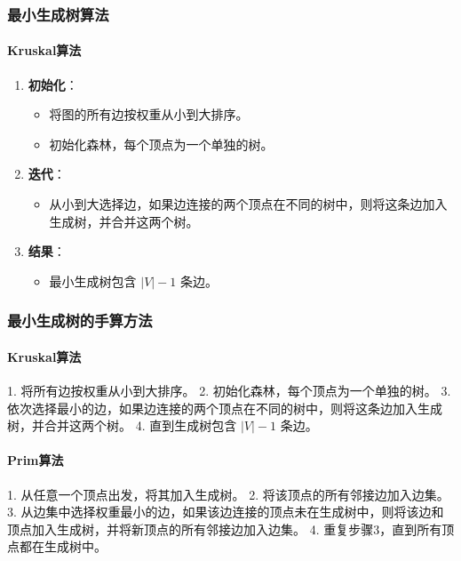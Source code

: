 \documentclass[UTF8]{ctexart}
\begin{document}
\subsubsection {最小生成树算法}
\paragraph{Kruskal算法}
\begin{enumerate}
    \item \textbf{初始化}：
        \begin{itemize}
            \item 将图的所有边按权重从小到大排序。
            \item 初始化森林，每个顶点为一个单独的树。
        \end{itemize}
    \item \textbf{迭代}：
        \begin{itemize}
            \item 从小到大选择边，如果边连接的两个顶点在不同的树中，则将这条边加入生成树，并合并这两个树。
        \end{itemize}
    \item \textbf{结果}：
        \begin{itemize}
            \item 最小生成树包含 \( |V| - 1 \) 条边。
        \end{itemize}
\end{enumerate}

\subsubsection {最小生成树的手算方法}
\paragraph{Kruskal算法}
1. 将所有边按权重从小到大排序。
2. 初始化森林，每个顶点为一个单独的树。
3. 依次选择最小的边，如果边连接的两个顶点在不同的树中，则将这条边加入生成树，并合并这两个树。
4. 直到生成树包含 \( |V| - 1 \) 条边。

\paragraph{Prim算法}
1. 从任意一个顶点出发，将其加入生成树。
2. 将该顶点的所有邻接边加入边集。
3. 从边集中选择权重最小的边，如果该边连接的顶点未在生成树中，则将该边和顶点加入生成树，并将新顶点的所有邻接边加入边集。
4. 重复步骤3，直到所有顶点都在生成树中。
\end{document}
